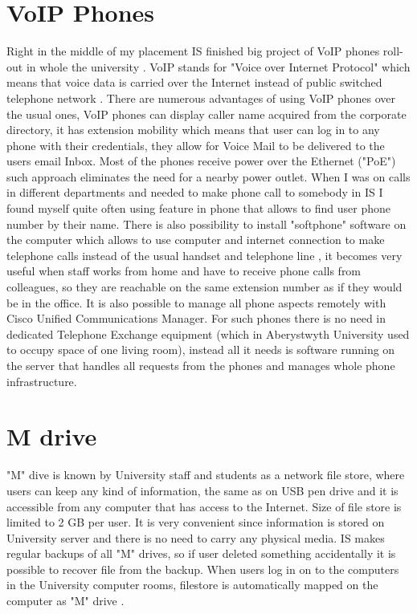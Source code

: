 \documentclass[10pt,a4paper,headinclude=true]{report}
\begin{document}
\section{VoIP Phones}
Right in the middle of my placement IS finished big project of VoIP phones roll-out in whole the university \cite{VoIP}. VoIP stands for "Voice over Internet Protocol" which means that voice data is carried over the Internet instead of public switched telephone network \cite{VoIP2}. There are numerous advantages of using VoIP phones over the usual ones, VoIP phones can display caller name acquired from the corporate directory, it has extension mobility which means that user can log in to any phone with their credentials, they allow for Voice Mail to be delivered to the users email Inbox. Most of the phones receive power over the Ethernet ("PoE") such approach eliminates the need for a nearby power outlet. When I was on calls in different departments and needed to make phone call to somebody in IS I found myself quite often using feature in phone that allows to find user phone number by their name. There is also possibility to install "softphone" software on the computer which allows to use computer and internet connection to make telephone calls instead of the usual handset and telephone line \cite{VoIP3}, it becomes very useful when staff works from home and have to receive phone calls from colleagues, so they are reachable on the same extension number as if they would be in the office. It is also possible to manage all phone aspects remotely with Cisco Unified Communications Manager. For such phones there is no need in dedicated Telephone Exchange equipment (which in Aberystwyth University used to occupy space of one living room), instead all it needs is software running on the server that handles all requests from the phones and manages whole phone infrastructure.  
\section{M drive}
"M" dive is known by University staff and students as a network file store, where users can keep any kind of information, the same as on USB pen drive and it is accessible from any computer that has access to the Internet. Size of file store is limited to 2 GB per user.  It is very convenient since information is stored on University server and there is no need to carry any physical media. IS makes regular backups of all "M" drives, so if user deleted something accidentally it is possible to recover file from the backup. When users log in on to the computers in the University computer rooms, filestore is automatically mapped on the computer as "M" drive \cite{MDrive}.
\end{document}
